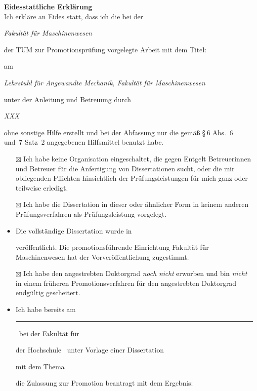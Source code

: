 \textbf{\Large Eidesstattliche Erkl\"{a}rung\\[1em]}
Ich erkl\"{a}re an Eides statt, dass ich die bei der
\begin{center} \emph{Fakult\"{a}t f\"{u}r Maschinenwesen} \end{center}
  der TUM zur Promotionspr\"{u}fung vorgelegte Arbeit mit dem Titel:
  \begin{center}
    \emph{\DissTitle}
  \end{center}
  \vspace*{-1ex}
  am
  \vspace*{-1ex}
  \begin{center}
    \emph{Lehrstuhl f\"{u}r Angewandte Mechanik, Fakult\"{a}t f\"{u}r Maschinenwesen}
  \end{center}
  unter der Anleitung und Betreuung durch
  \begin{center}
    \emph{XXX}
  \end{center}
  ohne sonstige Hilfe erstellt und bei der Abfassung nur die gem\"{a}\ss{} \S\,6 Abs.~6 und~7 Satz~2 angegebenen Hilfsmittel benutzt habe.\par
  \begin{itemize}
    \renewcommand*\labelitemi{$\square$}%
    \setlength{\itemsep}{0.2\itemsep}%
    \item[$\boxtimes$] Ich habe keine Organisation eingeschaltet, die gegen Entgelt Betreuerinnen und Betreuer f\"{u}r die Anfertigung von Dissertationen sucht, oder die mir obliegenden Pflichten hinsichtlich der Pr\"{u}fungsleistungen f\"{u}r mich ganz oder teilweise erledigt.
    \item[$\boxtimes$] Ich habe die Dissertation in dieser oder \"{a}hnlicher Form in keinem anderen Pr\"{u}fungsverfahren als Pr\"{u}fungsleistung vorgelegt.
    \item Die vollst\"{a}ndige Dissertation wurde in
    \hrulefill\par
    ver\"{o}ffentlicht.
    Die promotionsf\"{u}hrende Einrichtung Fakult\"{a}t f\"{u}r Maschinenwesen hat der Vorver\"{o}ffentlichung zugestimmt.
    \item[$\boxtimes$] Ich habe den angestrebten Doktorgrad \emph{noch nicht} erworben und bin \emph{nicht} in einem fr\"{u}heren Promotionsverfahren f\"{u}r den angestrebten Doktorgrad endg\"{u}ltig gescheitert.
    \item Ich habe bereits am \rule{2cm}{0.4pt}\ bei der Fakult\"{a}t f\"{u}r \hrulefill\par
    der Hochschule \hrulefill\
    unter Vorlage einer Dissertation\par mit dem Thema \hrulefill\par
    die Zulassung zur Promotion beantragt mit dem Ergebnis:
    \hrulefill%
  \end{itemize}
